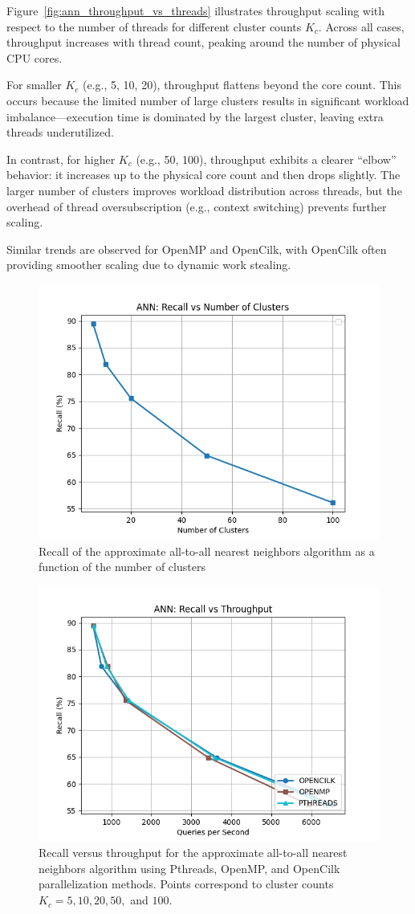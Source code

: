 \documentclass{article}
\begin{document}
Figure~\ref{fig:ann_throughput_vs_threads} illustrates throughput scaling with respect to the number of 
threads for different cluster counts $K_c$. Across all cases, throughput increases with thread count, 
peaking around the number of physical CPU cores.

For smaller $K_c$ (e.g., 5, 10, 20), throughput flattens beyond the core count. This occurs because 
the limited number of large clusters results in significant workload imbalance—execution time is 
dominated by the largest cluster, leaving extra threads underutilized.

In contrast, for higher $K_c$ (e.g., 50, 100), throughput exhibits a clearer ``elbow'' behavior: it 
increases up to the physical core count and then drops slightly. The larger number of clusters improves 
workload distribution across threads, but the overhead of thread oversubscription (e.g., context switching) 
prevents further scaling.

Similar trends are observed for OpenMP and OpenCilk, with OpenCilk often providing smoother scaling due to 
dynamic work stealing.

\begin{figure}
    \centering
    \includegraphics[width=0.5\linewidth]{figures/ann_recall_vs_clusters.png}
    \caption{Recall of the approximate all-to-all nearest neighbors algorithm as a function of the number of clusters}
    \label{fig:ann_recall_vs_clusters}
\end{figure}

\begin{figure}
    \centering
    \includegraphics[width=0.5\linewidth]{figures/ann_recall_vs_throughput.png}
    \caption{Recall versus throughput for the approximate all-to-all nearest neighbors algorithm using 
    Pthreads, OpenMP, and OpenCilk parallelization methods. Points correspond to cluster counts 
    $K_c = 5, 10, 20, 50,$ and $100$. }
    \label{fig:ann_recall_vs_throughput}
\end{figure}
\end{document}
